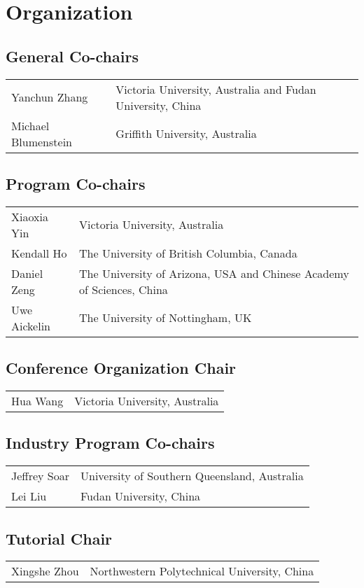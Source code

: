 \documentclass{llncs}
\begin{document}
\chapter*{Organization}
%
\section*{General Co-chairs}
\begin{tabular}{@{}p{5cm}@{}p{7.2cm}@{}}
Yanchun Zhang & Victoria University, Australia and \hfil\break Fudan University, China \\
Michael Blumenstein & Griffith University, Australia
\end{tabular}
%
\section*{Program Co-chairs}
\begin{tabular}{@{}p{5cm}@{}p{7.2cm}@{}}
Xiaoxia Yin & Victoria University, Australia \\
Kendall Ho & The University of British Columbia, Canada \\
Daniel Zeng & The University of Arizona, USA and \hfil\break Chinese Academy of Sciences, China\\
Uwe Aickelin & The University of Nottingham, UK
\end{tabular}
%
%
%

\section*{Conference Organization Chair}
\begin{tabular}{@{}p{5cm}@{}p{7.2cm}@{}}
Hua Wang & Victoria University, Australia
\end{tabular}
%

\section*{Industry Program Co-chairs}
\begin{tabular}{@{}p{5cm}@{}p{7.2cm}@{}}
Jeffrey Soar & University of Southern Queensland, Australia \\
Lei Liu & Fudan University, China
\end{tabular}
%
\section*{Tutorial Chair}
\begin{tabular}{@{}p{5cm}@{}p{7.2cm}@{}}
Xingshe Zhou & Northwestern Polytechnical University, China
\end{tabular}
\end{document}
